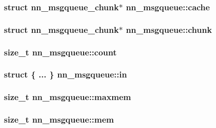 \subsubsection[{cache}]{\setlength{\rightskip}{0pt plus 5cm}struct {\bf nn\+\_\+msgqueue\+\_\+chunk}$\ast$ nn\+\_\+msgqueue\+::cache}\hypertarget{structnn__msgqueue_a4e886b7d4c87b147648980f4af8befa3}{}\label{structnn__msgqueue_a4e886b7d4c87b147648980f4af8befa3}
\subsubsection[{chunk}]{\setlength{\rightskip}{0pt plus 5cm}struct {\bf nn\+\_\+msgqueue\+\_\+chunk}$\ast$ nn\+\_\+msgqueue\+::chunk}\hypertarget{structnn__msgqueue_a57b0ce10a1e3ba159bb3e05e9e25ea57}{}\label{structnn__msgqueue_a57b0ce10a1e3ba159bb3e05e9e25ea57}
\subsubsection[{count}]{\setlength{\rightskip}{0pt plus 5cm}size\+\_\+t nn\+\_\+msgqueue\+::count}\hypertarget{structnn__msgqueue_aaa463916bbe4482be01ce84444383cfd}{}\label{structnn__msgqueue_aaa463916bbe4482be01ce84444383cfd}
\subsubsection[{in}]{\setlength{\rightskip}{0pt plus 5cm}struct \{ ... \}   nn\+\_\+msgqueue\+::in}\hypertarget{structnn__msgqueue_a86267100cce5ad85aa85a23c07a5cbf6}{}\label{structnn__msgqueue_a86267100cce5ad85aa85a23c07a5cbf6}
\subsubsection[{maxmem}]{\setlength{\rightskip}{0pt plus 5cm}size\+\_\+t nn\+\_\+msgqueue\+::maxmem}\hypertarget{structnn__msgqueue_a1989a55354b0a334168696d9c1b3e29b}{}\label{structnn__msgqueue_a1989a55354b0a334168696d9c1b3e29b}
\subsubsection[{mem}]{\setlength{\rightskip}{0pt plus 5cm}size\+\_\+t nn\+\_\+msgqueue\+::mem}\hypertarget{structnn__msgqueue_afd34fe72790a56ba9d99681fd2024b6c}{}\label{structnn__msgqueue_afd34fe72790a56ba9d99681fd2024b6c}
